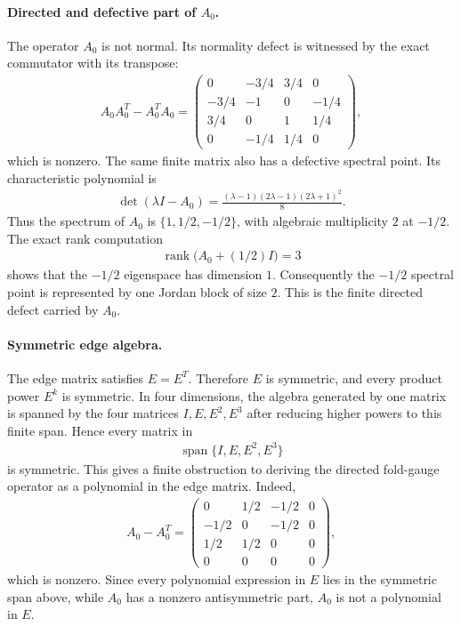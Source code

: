\paragraph{Directed and defective part of $A_0$.}
The operator $A_0$ is not normal.  Its normality defect is witnessed by the exact commutator with its transpose:
$$
\begin{aligned}
A_0A_0^T-A_0^TA_0=
\begin{pmatrix}
0&-3/4&3/4&0\\
-3/4&-1&0&-1/4\\
3/4&0&1&1/4\\
0&-1/4&1/4&0
\end{pmatrix},
\end{aligned}
$$
which is nonzero.  The same finite matrix also has a defective spectral point.  Its characteristic polynomial is
$$
\begin{aligned}
\det(\lambda I-A_0)=\frac{(\lambda-1)(2\lambda-1)(2\lambda+1)^2}{8}.
\end{aligned}
$$
Thus the spectrum of $A_0$ is $\{1,1/2,-1/2\}$, with algebraic multiplicity $2$ at $-1/2$.  The exact rank computation
$$
\begin{aligned}
\operatorname{rank}\bigl(A_0+(1/2)I\bigr)=3
\end{aligned}
$$
shows that the $-1/2$ eigenspace has dimension $1$.  Consequently the $-1/2$ spectral point is represented by one Jordan block of size $2$.  This is the finite directed defect carried by $A_0$.

\paragraph{Symmetric edge algebra.}
The edge matrix satisfies $E=E^T$.  Therefore $E$ is symmetric, and every product power $E^k$ is symmetric.  In four dimensions, the algebra generated by one matrix is spanned by the four matrices $I,E,E^2,E^3$ after reducing higher powers to this finite span.  Hence every matrix in
$$
\begin{aligned}
\operatorname{span}\{I,E,E^2,E^3\}
\end{aligned}
$$
is symmetric.  This gives a finite obstruction to deriving the directed fold-gauge operator as a polynomial in the edge matrix.  Indeed,
$$
\begin{aligned}
A_0-A_0^T=
\begin{pmatrix}
0&1/2&-1/2&0\\
-1/2&0&-1/2&0\\
1/2&1/2&0&0\\
0&0&0&0
\end{pmatrix},
\end{aligned}
$$
which is nonzero.  Since every polynomial expression in $E$ lies in the symmetric span above, while $A_0$ has a nonzero antisymmetric part, $A_0$ is not a polynomial in $E$.

